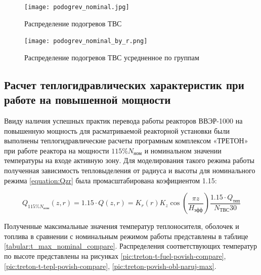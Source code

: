 \begin{figure}[H]
	\begin{center}
		\texttt{[image: podogrev\_nominal.jpg]}
		\caption{Распределение подогревов ТВС}
		\label{pic:treton-podogrev-nominal} %
	\end{center}
\end{figure}

\begin{figure}[H]
	\begin{center}
		\texttt{[image: podogrev\_nominal\_by\_r.png]}
		\caption{Распределение подогревов ТВС усредненное по группам}
		\label{pic:treton-podogrev-nominal-by-r} %
	\end{center}
\end{figure}


\subsection{Расчет теплогидравлических характеристик при работе на повышенной мощности}
Ввиду наличия успешных практик перевода работы реакторов ВВЭР-1000 на повышенную мощность для расматриваемой реакторной установки были выполнены теплогидравлические расчеты програмным комплексом «ТРЕТОН»
при работе реактора на мощности $115\% N_{\text{ном}}$ и номинальном значении температуры на входе активную зону. Для моделирования такого режима работы полученная зависимость тепловыделения от радиуса и высоты для номинального режима \ref{equation:Qzr} была промасштабирована коэфициентом 1.15:


\begin{equation}
	Q_{115 \% N_{\text{ном}}}(z,r) 
	= 1.15 \cdot Q(z,r) 
	= K_r(r) K_z \cos \left( 
		\frac{\pi z}{H_{\text{эфф}}} 
	  \right) 
	  \frac{1.15 \cdot Q_{\text{теп}}}{N_{\text{ТВС}} 30}
\end{equation}


Полученные максимальные значения температур теплоносителя, оболочек и топлива в сравнении с номинальным режимом работы представлены в таблице \ref{tabular:t_max_nominal_compare}. Распределения соответствующих температур по высоте представлены на рисунках \ref{pic:treton-t-fuel-povish-compare}, \ref{pic:treton-t-tepl-povish-compare}, \ref{pic:treton-povish-obl-naruj-max}. 


